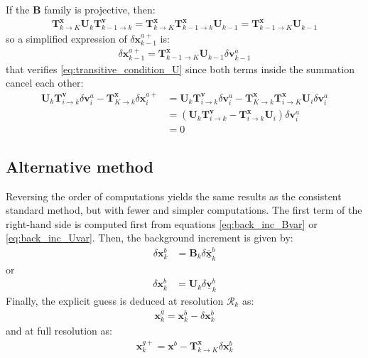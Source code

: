 \documentclass[12pt]{scrartcl}
\begin{document}
If the $\mathbf{B}$ family is projective, then:
\begin{align}
\mathbf{T}^\mathbf{x}_{k \rightarrow K} \mathbf{U}_k \mathbf{T}^\mathbf{v}_{k-1 \rightarrow k} = \mathbf{T}^\mathbf{x}_{k \rightarrow K} \mathbf{T}^\mathbf{x}_{k-1 \rightarrow k} \mathbf{U}_{k-1} = \mathbf{T}^\mathbf{x}_{k-1 \rightarrow K} \mathbf{U}_{k-1}
\end{align}
so a simplified expression of $\delta \mathbf{x}^{a+}_{k-1}$ is:
\begin{align}
\label{eq:projective_condition_U}
\delta \mathbf{x}^{a+}_{k-1} = \mathbf{T}^\mathbf{x}_{k-1 \rightarrow K} \mathbf{U}_{k-1} \delta \mathbf{v}^a_{k-1}
\end{align}
that verifies \eqref{eq:transitive_condition_U} since both terms inside the summation cancel each other:
\begin{align}
\mathbf{U}_k \mathbf{T}^\mathbf{v}_{i \rightarrow k} \delta \mathbf{v}^a_i - \mathbf{T}^\mathbf{x}_{K \rightarrow k} \delta \mathbf{x}^{a+}_i & = \mathbf{U}_k \mathbf{T}^\mathbf{v}_{i \rightarrow k} \delta \mathbf{v}^a_i - \mathbf{T}^\mathbf{x}_{K \rightarrow k} \mathbf{T}^\mathbf{x}_{i \rightarrow K} \mathbf{U}_i \delta \mathbf{v}^a_i \nonumber \\
& = \left(\mathbf{U}_k \mathbf{T}^\mathbf{v}_{i \rightarrow k} - \mathbf{T}^\mathbf{x}_{i \rightarrow k} \mathbf{U}_i \right) \delta \mathbf{v}^a_i \nonumber \\
& = 0
\end{align}

\subsection{Alternative method}
Reversing the order of computations yields the same results as the consistent standard method, but with fewer and simpler computations. The first term of the right-hand side is computed first from equations \eqref{eq:back_inc_Bvar} or \eqref{eq:back_inc_Uvar}. Then, the background increment is given by:
\begin{align}
\delta \mathbf{x}^b_k & = \mathbf{B}_k \delta \underline{\overline{\mathbf{x}}}^b_k
\end{align}
or
\begin{align}
\delta \mathbf{x}^b_k & = \mathbf{U}_k \delta \underline{\mathbf{v}}^b_k
\end{align}
Finally, the explicit guess is deduced at resolution $\mathcal{R}_k$ as:
\begin{align}
\mathbf{x}^g_k = \mathbf{x}^b_k - \delta \mathbf{x}^b_k
\end{align}
and at full resolution as:
\begin{align}
\mathbf{x}^{g+}_k = \mathbf{x}^b - \mathbf{T}^\mathbf{x}_{k \rightarrow K} \delta \mathbf{x}^b_k
\end{align}
\end{document}
